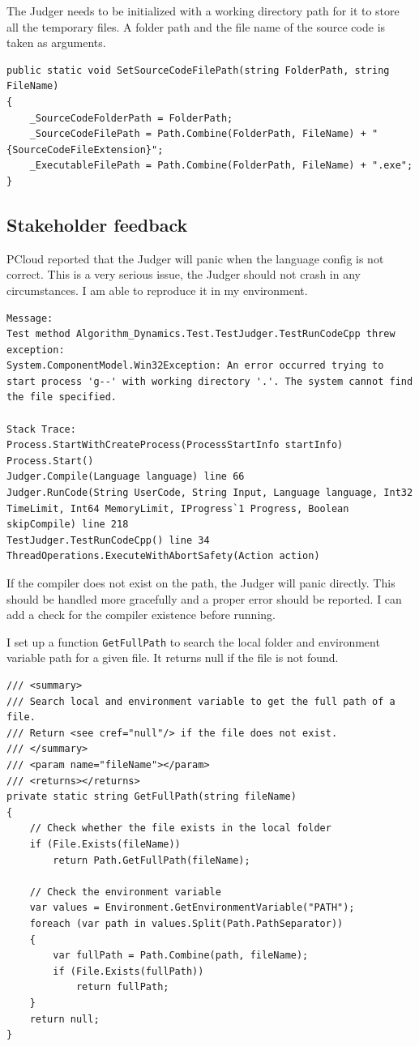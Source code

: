 \documentclass[a4paper]{report}
\newcommand{\code}{\texttt}
\begin{document}
The Judger needs to be initialized with a working directory path for it to store all the temporary files. A folder path and the file name of the source code is taken as arguments.

\begin{verbatim}
public static void SetSourceCodeFilePath(string FolderPath, string FileName)
{
    _SourceCodeFolderPath = FolderPath;
    _SourceCodeFilePath = Path.Combine(FolderPath, FileName) + "{SourceCodeFileExtension}";
    _ExecutableFilePath = Path.Combine(FolderPath, FileName) + ".exe";
}
\end{verbatim}


\subsection{Stakeholder feedback}

PCloud reported that the Judger will panic when the language config is not correct. This is a very serious issue, the Judger should not crash in any circumstances. I am able to reproduce it in my environment.

\begin{verbatim}
Message:
Test method Algorithm_Dynamics.Test.TestJudger.TestRunCodeCpp threw exception:
System.ComponentModel.Win32Exception: An error occurred trying to start process 'g--' with working directory '.'. The system cannot find the file specified.

Stack Trace:
Process.StartWithCreateProcess(ProcessStartInfo startInfo)
Process.Start()
Judger.Compile(Language language) line 66
Judger.RunCode(String UserCode, String Input, Language language, Int32 TimeLimit, Int64 MemoryLimit, IProgress`1 Progress, Boolean skipCompile) line 218
TestJudger.TestRunCodeCpp() line 34
ThreadOperations.ExecuteWithAbortSafety(Action action)
\end{verbatim}

If the compiler does not exist on the path, the Judger will panic directly. This should be handled more gracefully and a proper error should be reported. I can add a check for the compiler existence before running.

I set up a function \code{GetFullPath} to search the local folder and environment variable path for a given file. It returns null if the file is not found.

\begin{verbatim}
/// <summary>
/// Search local and environment variable to get the full path of a file.
/// Return <see cref="null"/> if the file does not exist.
/// </summary>
/// <param name="fileName"></param>
/// <returns></returns>
private static string GetFullPath(string fileName)
{
    // Check whether the file exists in the local folder
    if (File.Exists(fileName))
        return Path.GetFullPath(fileName);

    // Check the environment variable
    var values = Environment.GetEnvironmentVariable("PATH");
    foreach (var path in values.Split(Path.PathSeparator))
    {
        var fullPath = Path.Combine(path, fileName);
        if (File.Exists(fullPath))
            return fullPath;
    }
    return null;
}
\end{verbatim}
\end{document}
